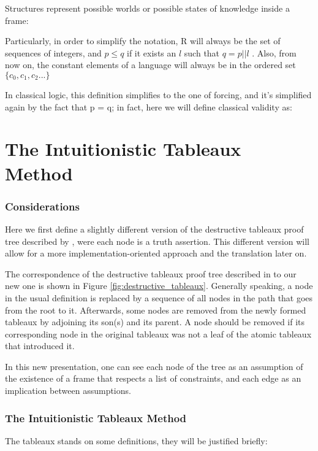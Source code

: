 \documentclass[runningheads]{llncs}
\begin{document}
\structureDefinition
Structures represent possible worlds or possible states of knowledge inside a frame:
\kripkeFrameDefinition

Particularly, in order to simplify the notation, R will always be the set of sequences of integers, and $p \leq q$ if it exists an $l$ such that $q =  p||l$  . 
 Also, from now on, the constant elements of a language will always be in the ordered set $\{c_0, c_1, c_2 ...\}$
 
 \figureRandFrame

\forcingDefinition

\intuitionisticValidityDefinition

In classical logic, this definition simplifies to the one of forcing, and it's simplified again by the fact that p = q; in fact, here we will define classical validity as: \cite{book1}

\classicalValidityDefinition

\section{The Intuitionistic Tableaux Method}

\subsubsection{Considerations}
    Here we first define a slightly different version of the destructive tableaux proof tree described by \cite{book1}, were each node is a truth assertion. This different version  will allow for a more implementation-oriented approach and the translation later on.

    The correspondence of the destructive tableaux proof tree described in \cite{book1} to our new one is shown in Figure \ref{fig:destructive_tableaux}. Generally speaking, a node in the usual definition is replaced by a sequence of all nodes in the path that goes from the root to it. Afterwards, some nodes are removed from the newly formed tableaux by adjoining its son(s) and its parent. A node should be removed if its corresponding node in the original tableaux was not a leaf of the atomic tableaux \cite{book1} that introduced it.


\tableauxCumulativeAndNonCumulativeExampleFigure
    In this new presentation, one can see each node of the tree as an assumption of the existence of 
    a frame that respects a list of constraints, and each edge as an implication between assumptions.
\subsubsection{The Intuitionistic Tableaux Method }
The tableaux stands on some definitions, they will be justified briefly:
\signedSentenceIntuitionisticDefinition
 
\end{document}
